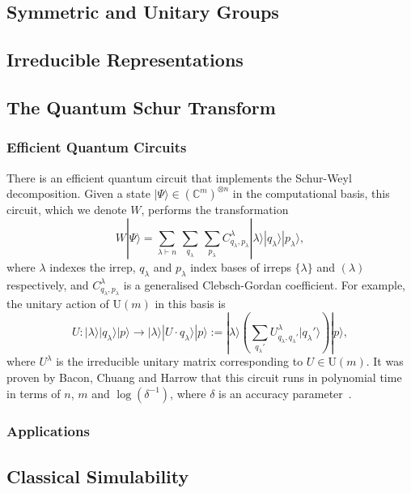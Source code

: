 \subsection{Symmetric and Unitary Groups}

\subsection{Irreducible Representations}

\subsection{The Quantum Schur Transform}

\subsubsection{Efficient Quantum Circuits}

There is an efficient quantum circuit that implements the Schur-Weyl decomposition.
Given a state $|\Psi\rangle \in (\mathbb{C}^m)^{\otimes n}$ in the computational basis, this circuit, which we denote $W$, performs the transformation
\begin{equation}
W|\Psi\rangle
 = \sum_{\lambda \vdash n} \, \sum_{q_{\lambda}} \, \sum_{p_\lambda}C^\lambda_{q_\lambda,p_\lambda}|\lambda\rangle|q_\lambda\rangle|p_\lambda\rangle , 
\end{equation}
where $\lambda$ indexes the irrep, $q_\lambda$ and $p_\lambda$ index bases of irreps $\{\lambda\}$ and $(\lambda)$ respectively, and $C^\lambda_{q_\lambda,p_\lambda}$ is a generalised Clebsch-Gordan coefficient.
For example, the unitary action of U$(m)$ in this basis is
\begin{equation}
U : |\lambda\rangle |q_\lambda\rangle |p\rangle \rightarrow |\lambda\rangle |U\cdot q_\lambda\rangle |p\rangle := |\lambda\rangle \left( \sum_{q_\lambda'} U^\lambda_{q_\lambda, q_\lambda'} |q_\lambda'\rangle \right) |p\rangle ,
\end{equation}
where $U^\lambda$ is the irreducible unitary matrix corresponding to $U \in \mathrm{U}(m)$.
It was proven by Bacon, Chuang and Harrow that this circuit runs in polynomial time in terms of $n$, $m$ and $\log(\delta^{-1})$, where $\delta$ is an accuracy parameter~\cite{bacon2007}.

\subsubsection{Applications}

\subsection{Classical Simulability}